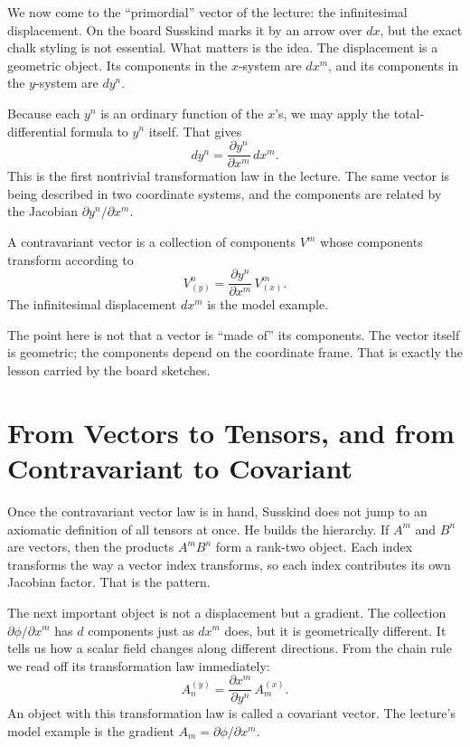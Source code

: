 We now come to the ``primordial'' vector of the lecture: the infinitesimal displacement. On the board Susskind marks it by an arrow over \(dx\), but the exact chalk styling is not essential. What matters is the idea. The displacement is a geometric object. Its components in the \(x\)-system are \(dx^{m}\), and its components in the \(y\)-system are \(dy^{n}\).

Because each \(y^{n}\) is an ordinary function of the \(x\)'s, we may apply the total-differential formula to \(y^{n}\) itself. That gives
\begin{equation}
dy^{n}=\frac{\partial y^{n}}{\partial x^{m}}\,dx^{m}.
\end{equation}
This is the first nontrivial transformation law in the lecture. The same vector is being described in two coordinate systems, and the components are related by the Jacobian \(\partial y^{n}/\partial x^{m}\).

\begin{definition}
A contravariant vector is a collection of components \(V^{m}\) whose components transform according to
\begin{equation}
V^{n}_{(y)}=\frac{\partial y^{n}}{\partial x^{m}}\,V^{m}_{(x)}.
\end{equation}
The infinitesimal displacement \(dx^{m}\) is the model example.
\end{definition}

The point here is not that a vector is ``made of'' its components. The vector itself is geometric; the components depend on the coordinate frame. That is exactly the lesson carried by the board sketches.

\section{From Vectors to Tensors, and from Contravariant to Covariant}

Once the contravariant vector law is in hand, Susskind does not jump to an axiomatic definition of all tensors at once. He builds the hierarchy. If \(A^{m}\) and \(B^{n}\) are vectors, then the products \(A^{m}B^{n}\) form a rank-two object. Each index transforms the way a vector index transforms, so each index contributes its own Jacobian factor. That is the pattern.

The next important object is not a displacement but a gradient. The collection \(\partial\phi/\partial x^{m}\) has \(d\) components just as \(dx^{m}\) does, but it is geometrically different. It tells us how a scalar field changes along different directions. From the chain rule we read off its transformation law immediately:
\begin{equation}
A^{(y)}_{n}=\frac{\partial x^{m}}{\partial y^{n}}\,A^{(x)}_{m}.
\end{equation}
An object with this transformation law is called a covariant vector. The lecture's model example is the gradient \(A_{m}=\partial\phi/\partial x^{m}\).

